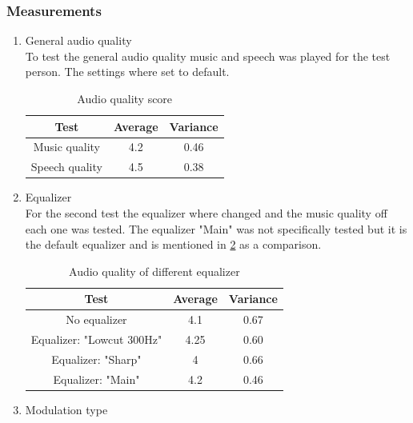 \subsubsection{Measurements}
\begin{enumerate}
    \item General audio quality \\
    To test the general audio quality music and speech was played for the test person. The settings where set to default.
    \begin{center}
     \begin{table}[h!]
    \centering
    \begin{tabular}{ |c|c|c|}
      \hline 
      Test & Average & Variance \\ 
      \hline
     Music quality & 4.2 & 0.46 \\
     \hline
     Speech quality & 4.5 & 0.38 \\
     \hline
    \end{tabular}
    \caption{Audio quality score}
    \label{6.1.2_tab:music_audio_quality}
    \end{table}   
    \end{center}
    \item Equalizer \\
    For the second test the equalizer where changed and the music quality off each one was tested. The equalizer "Main" was not specifically tested but it is the default equalizer and is mentioned in \ref{6.1.2_tab:music_audio_quality_eq} as a comparison.
     \begin{center}
     \begin{table}[h!]
    \centering
    \begin{tabular}{ |c|c|c|}
      \hline 
      Test & Average & Variance \\ 
      \hline
     No equalizer & 4.1 & 0.67 \\
     \hline
     Equalizer: "Lowcut 300Hz" & 4.25 & 0.60 \\
     \hline
     Equalizer: "Sharp" & 4 & 0.66 \\
     \hline
     Equalizer: "Main" & 4.2 & 0.46 \\
     \hline
    \end{tabular}
    \caption{Audio quality of different equalizer}
    \label{6.1.2_tab:music_audio_quality_eq}
    \end{table}   
    \end{center}
    \item Modulation type \\

\end{enumerate}
